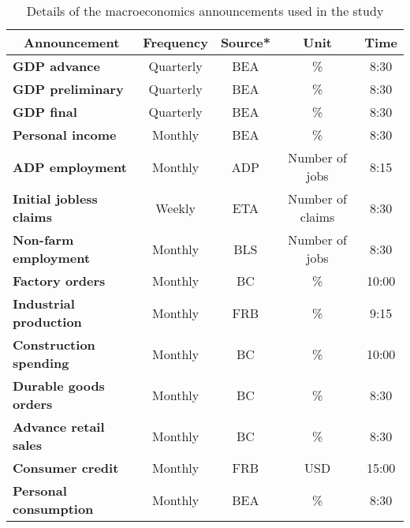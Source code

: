 \begin{table}[] 
\begin{center}
\caption{Details of the macroeconomics announcements used in the study}
\label{tab:stat1}
\begin{tabular}{@{}lcccc@{}}
\toprule
\multicolumn{1}{c}{\textbf{Announcement}} & \textbf{Frequency} & \textbf{Source*} & \textbf{Unit}     & \textbf{Time} \\ \midrule
\textbf{GDP advance}                      & Quarterly          & BEA             & \%                & 8:30          \\
\textbf{GDP preliminary}                  & Quarterly          & BEA             & \%                & 8:30          \\
\textbf{GDP final}                        & Quarterly          & BEA             & \%                & 8:30          \\
\textbf{Personal income}                  & Monthly            & BEA             & \%                & 8:30          \\
\textbf{ADP employment}                   & Monthly            & ADP             & Number of jobs    & 8:15          \\
\textbf{Initial jobless claims}           & Weekly             & ETA             & Number of claims  & 8:30          \\
\textbf{Non-farm employment}              & Monthly            & BLS             & Number of jobs    & 8:30          \\
\textbf{Factory orders}                   & Monthly            & BC              & \%                & 10:00         \\
\textbf{Industrial production}            & Monthly            & FRB             & \%                & 9:15          \\
\textbf{Construction spending}            & Monthly            & BC              & \%                & 10:00         \\
\textbf{Durable goods orders}             & Monthly            & BC              & \%                & 8:30          \\
\textbf{Advance retail sales}             & Monthly            & BC              & \%                & 8:30          \\
\textbf{Consumer credit}                  & Monthly            & FRB             & USD               & 15:00         \\
\textbf{Personal consumption}             & Monthly            & BEA             & \%                & 8:30          \\

\end{tabular}
\end{center}
\end{table}
